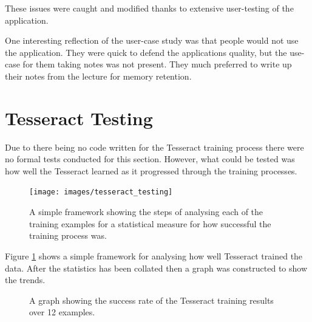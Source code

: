 These issues were caught and modified thanks to extensive user-testing of the application.

One interesting reflection of the user-case study was that people would not use the application. They were quick to defend the applications quality, but the use-case for them taking notes was not present. They much preferred to write up their notes from the lecture for memory retention.

\section{Tesseract Testing}
Due to there being no code written for the Tesseract training process there were no formal tests conducted for this section. However, what could be tested was how well the Tesseract learned as it progressed through the training processes.

\begin{figure}[h]
  \centering
  \texttt{[image: images/tesseract\_testing]}
  \caption{A simple framework showing the steps of analysing each of the training examples for a statistical measure for how successful the training process was.}
  \label{fig:tesseract_framework}
\end{figure}

Figure \ref{fig:tesseract_framework} shows a simple framework for analysing how well Tesseract trained the data. After the statistics has been collated then a graph was constructed to show the trends.
\begin{figure}[h]
  \centering
{}
\caption{A graph showing the success rate of the Tesseract training results over 12 examples.}
\label{fig:tesseract_graph}
\end{figure}

